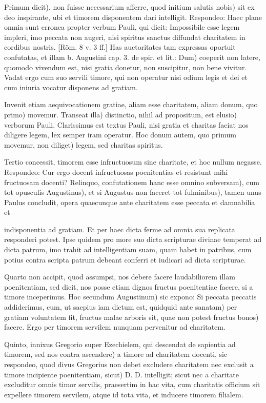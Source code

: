 Primum dicit), non fuisse necessarium afferre, quod initium salutis nobis) sit ex deo inspirante, ubi et timorem disponentem dari intelligit. Respondeo: Haec plane omnia sunt erronea propter verbum Pauli, qui dicit: Impossibile esse legem impleri, imo peccata non augeri, nisi spiritus sanctus diffundat charitatem in cordibus nostris. [Röm. 8 v. 3 ff.] Has auctoritates tam expressas oportuit confutatas, et illam b. Augustini cap. 3. de spir. et lit.: Dum) coeperit non latere, quomodo vivendum est, nisi gratia donetur, non suscipitur, non bene vivitur. Vadat ergo cum suo servili timore, qui non operatur nisi odium legis et dei et cum iniuria vocatur disponens ad gratiam.

Invenit etiam aequivocationem gratiae, aliam esse charitatem, aliam donum, quo primo) movemur. Transeat illa) distinctio, nihil ad propositum, est elusio) verborum Pauli. Clarissimus est textus Pauli, nisi gratia et charitas faciat nos diligere legem, lex semper iram operatur. Hoc donum autem, quo primum movemur, non diliget) legem, sed charitas spiritus.

Tertio concessit, timorem esse infructuosum sine charitate, et hoc nullum negasse. Respondeo: Cur ergo docent infructuosas poenitentias et resistunt mihi fructuosam docenti? Relinquo, confutationem hanc esse omnino subversam), cum tot opusculis Augustinus), et si Augustus non faceret tot fulminibus), tamen unus Paulus concludit, opera quaecunque ante charitatem esse peccata et damnabilia \marginpar{\small[369]} et

indisponentia ad gratiam. Et per haec dicta ferme ad omnia sua replicata responderi potest. Ipse quidem pro more suo dicta scripturae divinae temperat ad dicta patrum, imo trahit ad intelligentiam suam, quam habet in patribus, cum potius contra scripta patrum debeant conferri et iudicari ad dicta scripturae.

Quarto non accipit, quod assumpsi, nos debere facere laudabiliorem illam poenitentiam, sed dicit, nos posse etiam dignos fructus poenitentiae facere, si a timore inceperimus. Hoc secundum Augustinum) sic expono: Si peccata peccatis addiderimus, cum, ut saepius iam dictum est, quidquid ante sanatam) per gratiam voluntatem fit, fructus malae arboris sit, quae non potest fructus bonos) facere. Ergo per timorem servilem nunquam pervenitur ad charitatem.

Quinto, innixus Gregorio super Ezechielem, qui descendat de sapientia ad timorem, sed nos contra ascendere) a timore ad charitatem docenti, sic respondeo, quod divus Gregorius non debet excludere charitatem nec exclusit a timore incipiente poenitentiam, sicut) D. D. intelligit; sicut nec a charitate excluditur omnis timor servilis, praesertim in hac vita, cum charitatis officium sit expellere timorem servilem, atque id tota vita, et inducere timorem filialem.

